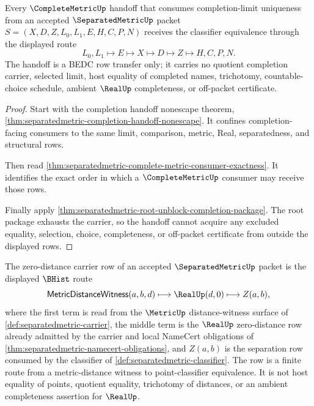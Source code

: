 \begin{theorem}
\label{thm:separatedmetric-complete-metric-root-handoff}
Every $\CompleteMetricUp$ handoff that consumes completion-limit uniqueness from an accepted $\SeparatedMetricUp$ packet $S=(X,D,Z,L_0,L_1,E,H,C,P,N)$ receives the classifier equivalence through the displayed route
$$
L_0,L_1 \longmapsto E \longmapsto X \longmapsto D \longmapsto Z \longmapsto H,C,P,N.
$$
The handoff is a BEDC row transfer only; it carries no quotient completion carrier, selected limit, host equality of completed names, trichotomy, countable-choice schedule, ambient $\RealUp$ completeness, or off-packet certificate.
\end{theorem}
\begin{proof}
Start with the completion handoff nonescape theorem, \autoref{thm:separatedmetric-completion-handoff-nonescape}. It confines completion-facing consumers to the same limit, comparison, metric, Real, separatedness, and structural rows.

Then read \autoref{thm:separatedmetric-complete-metric-consumer-exactness}. It identifies the exact order in which a $\CompleteMetricUp$ consumer may receive those rows.

Finally apply \autoref{thm:separatedmetric-root-unblock-completion-package}. The root package exhausts the carrier, so the handoff cannot acquire any excluded equality, selection, choice, completeness, or off-packet certificate from outside the displayed rows.
\end{proof}

\begin{definition}\label{def:separatedmetric-zero-distance-carrier-row}
The zero-distance carrier row of an accepted $\SeparatedMetricUp$ packet is the displayed $\BHist$ route
$$
\mathsf{MetricDistanceWitness}(a,b,d) \longmapsto \RealUp(d,0) \longmapsto Z(a,b),
$$
where the first term is read from the $\MetricUp$ distance-witness surface of \autoref{def:separatedmetric-carrier}, the middle term is the $\RealUp$ zero-distance row already admitted by the carrier and local NameCert obligations of \autoref{thm:separatedmetric-namecert-obligations}, and $Z(a,b)$ is the separation row consumed by the classifier of \autoref{def:separatedmetric-classifier}. The row is a finite route from a metric-distance witness to point-classifier equivalence. It is not host equality of points, quotient equality, trichotomy of distances, or an ambient completeness assertion for $\RealUp$.
\end{definition}

